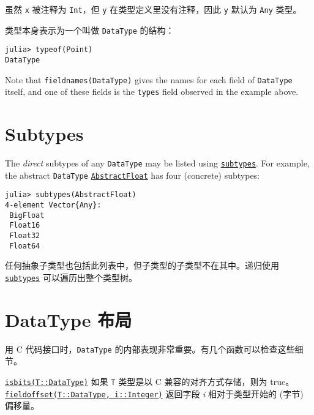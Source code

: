 虽然 \texttt{x} 被注释为 \texttt{Int}，但 \texttt{y} 在类型定义里没有注释，因此 \texttt{y} 默认为 \texttt{Any} 类型。



类型本身表示为一个叫做 \texttt{DataType} 的结构：




\begin{verbatim}
julia> typeof(Point)
DataType
\end{verbatim}



Note that \texttt{fieldnames(DataType)} gives the names for each field of \texttt{DataType} itself, and one of these fields is the \texttt{types} field observed in the example above.



\hypertarget{11371291537025953368}{}


\section{Subtypes}



The \emph{direct} subtypes of any \texttt{DataType} may be listed using \hyperlink{13112219412833772146}{\texttt{subtypes}}. For example, the abstract \texttt{DataType} \hyperlink{11465394427882483091}{\texttt{AbstractFloat}} has four (concrete) subtypes:




\begin{verbatim}
julia> subtypes(AbstractFloat)
4-element Vector{Any}:
 BigFloat
 Float16
 Float32
 Float64
\end{verbatim}



任何抽象子类型也包括此列表中，但子类型的子类型不在其中。递归使用 \hyperlink{13112219412833772146}{\texttt{subtypes}} 可以遍历出整个类型树。



\hypertarget{7724659828636149961}{}


\section{DataType 布局}



用 C 代码接口时，\texttt{DataType} 的内部表现非常重要。有几个函数可以检查这些细节。



\hyperlink{12980593021531333073}{\texttt{isbits(T::DataType)}} 如果 \texttt{T} 类型是以 C 兼容的对齐方式存储，则为 true。    \hyperlink{6956980533195055227}{\texttt{fieldoffset(T::DataType, i::Integer)}} 返回字段 \emph{i} 相对于类型开始的 (字节) 偏移量。



